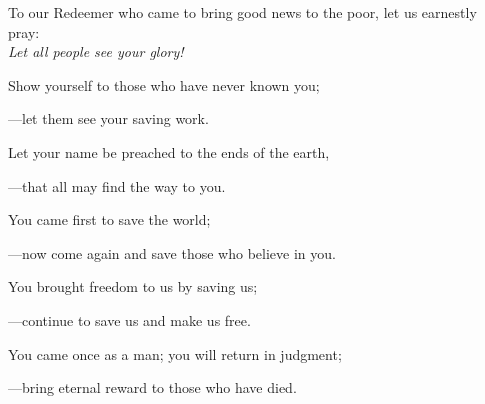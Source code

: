 \intercessions\indent

\begin{hangpar}

To our Redeemer who came to bring good news to the poor, let us earnestly pray:\\
\emph{Let all people see your glory!}

\medskip Show yourself to those who have never known you;

{\color{red}---\thinspace}let them see your saving work.

\medskip Let your name be preached to the ends of the earth,

{\color{red}---\thinspace}that all may find the way to you.

\medskip You came first to save the world;

{\color{red}---\thinspace}now come again and save those who believe in you.

\medskip You brought freedom to us by saving us;

{\color{red}---\thinspace}continue to save us and make us free.

\medskip You came once as a man; you will return in judgment;

{\color{red}---\thinspace}bring eternal reward to those who have died.

\end{hangpar}